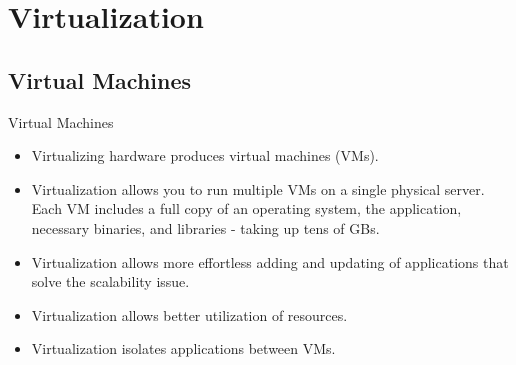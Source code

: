 

\section{Virtualization}\label{sec:virtualization}

\subsection{Virtual Machines}\label{subsec:virtual-machines}
\begin{frame}{Virtual Machines}
    \begin{itemize}[<+- | alert@+>]
        \item Virtualizing hardware produces virtual machines (VMs).
        \item Virtualization allows you to run multiple VMs on a single physical server.
        Each VM includes a full copy of an operating system, the application, necessary binaries, and libraries - taking up tens of GBs.
        \item Virtualization allows more effortless adding and updating of applications that solve the scalability issue.
        \item Virtualization allows better utilization of resources.
        \item Virtualization isolates applications between VMs.
    \end{itemize}
\end{frame}


